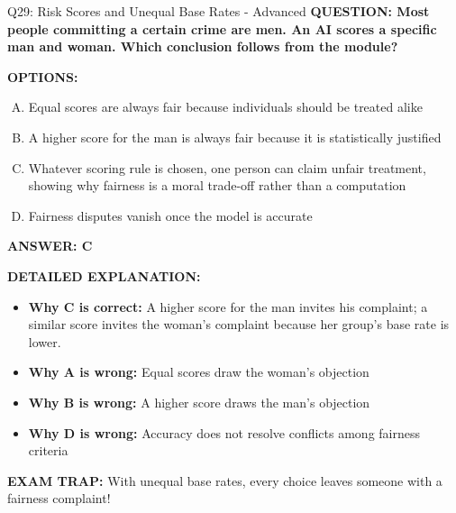 \documentclass[8pt]{beamer}
\begin{document}
\begin{frame}[shrink=6]{Q29: Risk Scores and Unequal Base Rates - Advanced}
\fontsize{6.5}{7.5}\selectfont
\textbf{QUESTION: Most people committing a certain crime are men. An AI scores a specific man and woman. Which conclusion follows from the module?}

\vspace{0.1cm}
\textbf{OPTIONS:}
\begin{enumerate}[A.]
\item Equal scores are always fair because individuals should be treated alike
\item A higher score for the man is always fair because it is statistically justified
\item Whatever scoring rule is chosen, one person can claim unfair treatment, showing why fairness is a moral trade-off rather than a computation
\item Fairness disputes vanish once the model is accurate
\end{enumerate}

\vspace{0.1cm}
\textcolor{myblue}{\textbf{ANSWER: C}}

\vspace{0.1cm}
\textbf{DETAILED EXPLANATION:}
\begin{itemize}
\item \textbf{Why C is correct:} A higher score for the man invites his complaint; a similar score invites the woman's complaint because her group's base rate is lower.
\item \textbf{Why A is wrong:} Equal scores draw the woman's objection
\item \textbf{Why B is wrong:} A higher score draws the man's objection
\item \textbf{Why D is wrong:} Accuracy does not resolve conflicts among fairness criteria
\end{itemize}

\textcolor{myred}{\textbf{EXAM TRAP:}} With unequal base rates, every choice leaves someone with a fairness complaint!
\end{frame}
\end{document}
